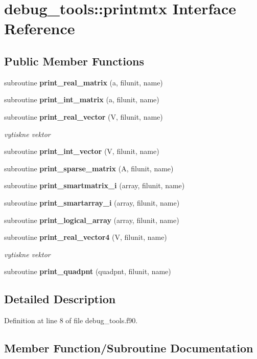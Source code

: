 \section{debug\+\_\+tools\+:\+:printmtx Interface Reference}
\label{interfacedebug__tools_1_1printmtx}
\subsection*{Public Member Functions}
\begin{DoxyCompactItemize}
\item 
subroutine {\bf print\+\_\+real\+\_\+matrix} (a, filunit, name)
\item 
subroutine {\bf print\+\_\+int\+\_\+matrix} (a, filunit, name)
\item 
subroutine {\bf print\+\_\+real\+\_\+vector} (V, filunit, name)
\begin{DoxyCompactList}\small\item\em vytiskne vektor \end{DoxyCompactList}\item 
subroutine {\bf print\+\_\+int\+\_\+vector} (V, filunit, name)
\item 
subroutine {\bf print\+\_\+sparse\+\_\+matrix} (A, filunit, name)
\item 
subroutine {\bf print\+\_\+smartmatrix\+\_\+i} (array, filunit, name)
\item 
subroutine {\bf print\+\_\+smartarray\+\_\+i} (array, filunit, name)
\item 
subroutine {\bf print\+\_\+logical\+\_\+array} (array, filunit, name)
\item 
subroutine {\bf print\+\_\+real\+\_\+vector4} (V, filunit, name)
\begin{DoxyCompactList}\small\item\em vytiskne vektor \end{DoxyCompactList}\item 
subroutine {\bf print\+\_\+quadpnt} (quadpnt, filunit, name)
\end{DoxyCompactItemize}


\subsection{Detailed Description}


Definition at line 8 of file debug\+\_\+tools.\+f90.



\subsection{Member Function/\+Subroutine Documentation}
